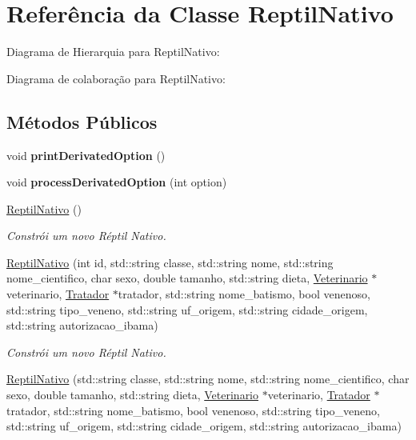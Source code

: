\hypertarget{classReptilNativo}{}\section{Referência da Classe Reptil\+Nativo}
\label{classReptilNativo}


Diagrama de Hierarquia para Reptil\+Nativo\+:


Diagrama de colaboração para Reptil\+Nativo\+:
\subsection*{Métodos Públicos}
\begin{DoxyCompactItemize}
\item 
\mbox{\label{classReptilNativo_a208551425c4ce07beb9ccc9f7830f7ba}} 
void {\bfseries print\+Derivated\+Option} ()
\item 
\mbox{\label{classReptilNativo_ab3ffa8aac371437a13b09f36e9f2e95c}} 
void {\bfseries process\+Derivated\+Option} (int option)
\item 
\mbox{\label{classReptilNativo_a584bba0a356b2b3b961098541951fcbd}} 
\hyperlink{classReptilNativo_a584bba0a356b2b3b961098541951fcbd}{Reptil\+Nativo} ()
\begin{DoxyCompactList}\small\item\em Constrói um novo Réptil Nativo. \end{DoxyCompactList}\item 
\hyperlink{classReptilNativo_a1dcdc77205b5491129db3553bbf520fc}{Reptil\+Nativo} (int id, std\+::string classe, std\+::string nome, std\+::string nome\+\_\+cientifico, char sexo, double tamanho, std\+::string dieta, \hyperlink{classVeterinario}{Veterinario} $\ast$veterinario, \hyperlink{classTratador}{Tratador} $\ast$tratador, std\+::string nome\+\_\+batismo, bool venenoso, std\+::string tipo\+\_\+veneno, std\+::string uf\+\_\+origem, std\+::string cidade\+\_\+origem, std\+::string autorizacao\+\_\+ibama)
\begin{DoxyCompactList}\small\item\em Constrói um novo Réptil Nativo. \end{DoxyCompactList}\item 
\hyperlink{classReptilNativo_acd12c75a625763f1114d792991ccfa9b}{Reptil\+Nativo} (std\+::string classe, std\+::string nome, std\+::string nome\+\_\+cientifico, char sexo, double tamanho, std\+::string dieta, \hyperlink{classVeterinario}{Veterinario} $\ast$veterinario, \hyperlink{classTratador}{Tratador} $\ast$tratador, std\+::string nome\+\_\+batismo, bool venenoso, std\+::string tipo\+\_\+veneno, std\+::string uf\+\_\+origem, std\+::string cidade\+\_\+origem, std\+::string autorizacao\+\_\+ibama)

\end{DoxyCompactItemize}
